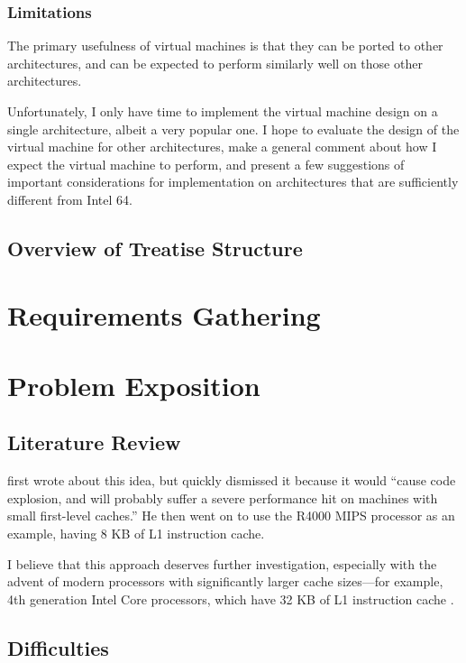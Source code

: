 		
		\subsection{Limitations}
			The primary usefulness of virtual machines is that they can be ported to other architectures, and can be expected to perform similarly well on those other architectures. 
			
			Unfortunately, I only have time to implement the virtual machine design on a single architecture, albeit a very popular one. I hope to evaluate the design of the virtual machine for other architectures, make a general comment about how I expect the virtual machine to perform, and present a few suggestions of important considerations for implementation on architectures that are sufficiently  different from Intel 64.
				
	\section{Overview of Treatise Structure}
	
\chapter{Requirements Gathering}

\chapter{Problem Exposition}
	\section{Literature Review}
		\cite{stackcaching} first wrote about this idea, but quickly dismissed it because it would ``cause code explosion, and will probably suffer a severe performance hit on machines with small first-level caches.'' He then went on to use the R4000 MIPS processor as an example, having 8 KB of L1 instruction cache.
	
		I believe that this approach deserves further investigation, especially with the advent of modern processors with significantly larger cache sizes---for example, 4th generation Intel Core processors, which have 32 KB of L1 instruction cache \citep{haswellarch}.
	
	\section{Difficulties}

